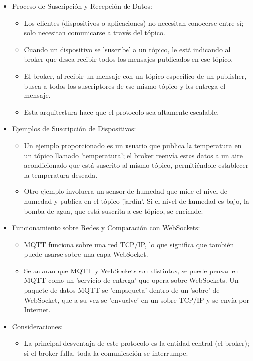 \documentclass{report}
\begin{document}
\begin{itemize}
    \item Proceso de Suscripción y Recepción de Datos:
        \begin{itemize}
            \item Los clientes (dispositivos o aplicaciones) no necesitan conocerse entre sí; solo necesitan comunicarse a través del tópico.
            \item Cuando un dispositivo se 'suscribe' a un tópico, le está indicando al broker que desea recibir todos los mensajes publicados 
            en ese tópico.
            \item El broker, al recibir un mensaje con un tópico específico de un publisher, busca a todos los suscriptores de ese 
            mismo tópico y les entrega el mensaje.
            \item Esta arquitectura hace que el protocolo sea altamente escalable.
        \end{itemize}

    \item Ejemplos de Suscripción de Dispositivos:
        \begin{itemize}
            \item Un ejemplo proporcionado es un usuario que publica la temperatura en un tópico llamado 'temperatura'; el broker 
            reenvía estos datos a un aire acondicionado que está suscrito al mismo tópico, permitiéndole establecer la temperatura deseada.
            \item Otro ejemplo involucra un sensor de humedad que mide el nivel de humedad y publica en el tópico 'jardín'. 
            Si el nivel de humedad es bajo, la bomba de agua, que está suscrita a ese tópico, se enciende.
        \end{itemize}

    \item Funcionamiento sobre Redes y Comparación con WebSockets:
        \begin{itemize}
            \item MQTT funciona sobre una red TCP/IP, lo que significa que también puede usarse sobre una capa WebSocket.
            \item Se  aclaran que MQTT y WebSockets son distintos; se puede pensar en MQTT como un 'servicio de entrega' 
            que opera sobre WebSockets. Un paquete de datos MQTT se 'empaqueta' dentro de un 'sobre' de WebSocket, que a su vez se 
            'envuelve' en un sobre TCP/IP y se envía por Internet.
        \end{itemize}

    \item Consideraciones:
        \begin{itemize}
            \item La principal desventaja de este protocolo es la entidad central (el broker); si el broker falla, toda 
            la comunicación se interrumpe.            
        \end{itemize}
\end{itemize}
\end{document}
